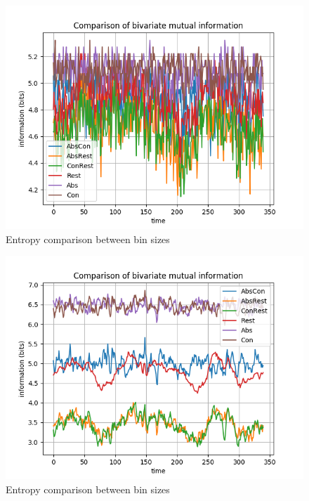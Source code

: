 \begin{figure}[!htb]
\caption{Entropy comparison between bin sizes}
\label{40-trials}
    \centering
    \includegraphics[width=\textwidth]{fig/subject1_40trials_all-channel-1}
\end{figure}

\begin{figure}[!htb]
\caption{Entropy comparison between bin sizes}
\label{all-trials}
    \centering
    \includegraphics[width=\textwidth]{fig/subject1_alltrials_all-channel-1}
\end{figure}